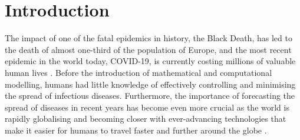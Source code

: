 \documentclass[smallextended]{svjour3}       %
\begin{document}
\section{Introduction}

The impact of one of the fatal epidemics in history, the Black Death, has led to the death of almost one-third of the population of Europe, and the most recent epidemic in the world today, COVID-19, is currently costing millions of valuable human lives \cite{glatter2021history}. Before the introduction of mathematical and computational modelling, humans had little knowledge of effectively controlling and minimising the spread of infectious diseases. Furthermore, the importance of forecasting the spread of diseases in recent years has become even more crucial as the world is rapidly globalising and becoming closer with ever-advancing technologies that make it easier for humans to travel faster and further around the globe \cite{saker2004globalization}.
\end{document}
